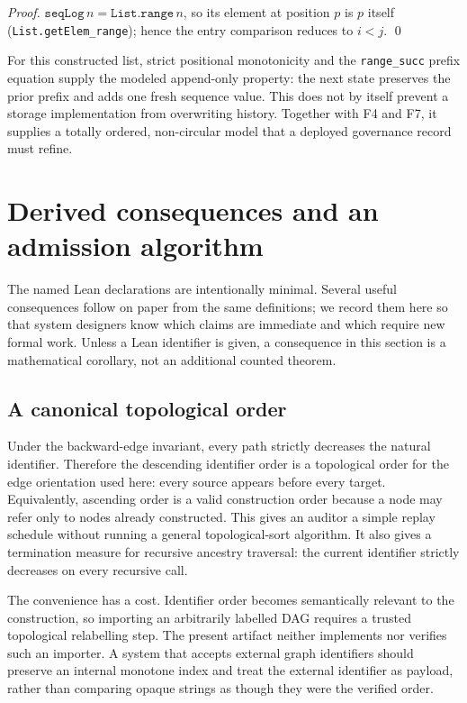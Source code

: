 \documentclass[11pt,letterpaper]{article}
\theoremstyle{definition}
\begin{document}
\begin{proof}
$\texttt{seqLog}\,n = \texttt{List.range}\,n$, so its element at position $p$ is
$p$ itself (\texttt{List.getElem\_range}); hence the entry comparison reduces to
$i < j$. \qed
\end{proof}

For this constructed list, strict positional monotonicity and the
\texttt{range\_succ} prefix equation supply the modeled append-only property:
the next state preserves the prior prefix and adds one fresh sequence value.
This does not by itself prevent a storage implementation from overwriting
history. Together with F4 and F7, it supplies a totally ordered, non-circular
model that a deployed governance record must refine.

\section{Derived consequences and an admission algorithm}
\label{sec:derived}

The named Lean declarations are intentionally minimal. Several useful
consequences follow on paper from the same definitions; we record them here so
that system designers know which claims are immediate and which require new
formal work. Unless a Lean identifier is given, a consequence in this section
is a mathematical corollary, not an additional counted theorem.

\subsection{A canonical topological order}

Under the backward-edge invariant, every path strictly decreases the natural
identifier. Therefore the descending identifier order is a topological order
for the edge orientation used here: every source appears before every target.
Equivalently, ascending order is a valid construction order because a node may
refer only to nodes already constructed. This gives an auditor a simple replay
schedule without running a general topological-sort algorithm. It also gives a
termination measure for recursive ancestry traversal: the current identifier
strictly decreases on every recursive call.

The convenience has a cost. Identifier order becomes semantically relevant to
the construction, so importing an arbitrarily labelled DAG requires a trusted
topological relabelling step. The present artifact neither implements nor
verifies such an importer. A system that accepts external graph identifiers
should preserve an internal monotone index and treat the external identifier as
payload, rather than comparing opaque strings as though they were the verified
order.
\end{document}
